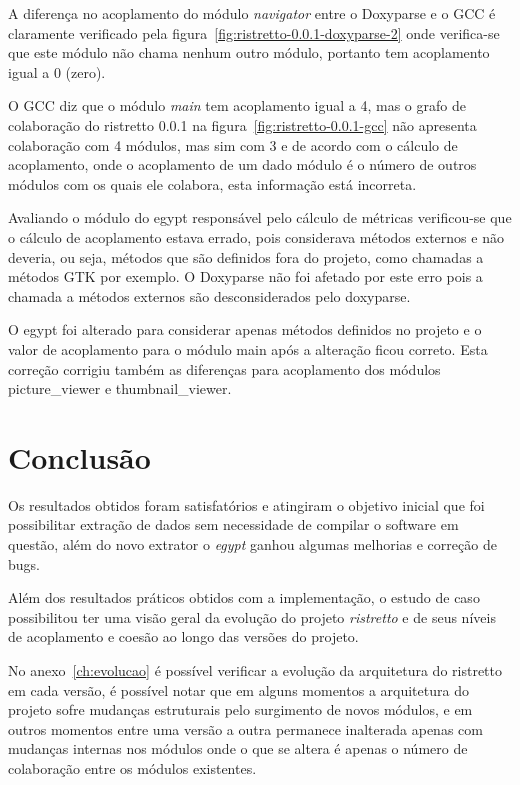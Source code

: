 A diferença no acoplamento do módulo {\it navigator} entre o Doxyparse e o GCC
é claramente verificado pela figura~\ref{fig:ristretto-0.0.1-doxyparse-2} onde
verifica-se que este módulo não chama nenhum outro módulo, portanto tem
acoplamento igual a 0 (zero).

O GCC diz que o módulo {\it main} tem acoplamento igual a 4, mas o grafo de
colaboração do ristretto 0.0.1 na figura~\ref{fig:ristretto-0.0.1-gcc} não
apresenta colaboração com 4 módulos, mas sim com 3 e de acordo com o cálculo de
acoplamento, onde o acoplamento de um dado módulo é o número de outros módulos
com os quais ele colabora, esta informação está incorreta.

Avaliando o módulo do egypt responsável pelo cálculo de métricas verificou-se
que o cálculo de acoplamento estava errado, pois considerava métodos externos e
não deveria, ou seja, métodos que são definidos fora do projeto, como chamadas
a métodos GTK por exemplo. O Doxyparse não foi
afetado por este erro pois a chamada a métodos externos são desconsiderados
pelo doxyparse.

O egypt foi alterado para considerar apenas métodos definidos no projeto e o
valor de acoplamento para o módulo main após a alteração ficou correto. Esta
correção corrigiu também as diferenças para acoplamento dos módulos
picture\_viewer e thumbnail\_viewer.


\chapter{Conclusão} \label{ch:conclusao}

Os resultados obtidos foram satisfatórios e atingiram o objetivo inicial que
foi possibilitar extração de dados sem necessidade de compilar o software em
questão, além do novo extrator o {\it egypt} ganhou algumas melhorias e
correção de bugs.

Além dos resultados práticos obtidos com a implementação, o estudo de caso
possibilitou ter uma visão geral da evolução do projeto {\it ristretto} e de
seus níveis de acoplamento e coesão ao longo das versões do projeto.

No anexo~\ref{ch:evolucao} é possível verificar a evolução da arquitetura do
ristretto em cada versão, é possível notar que em alguns momentos a arquitetura
do projeto sofre mudanças estruturais pelo surgimento de novos módulos, e em
outros momentos entre uma versão a outra permanece inalterada apenas com
mudanças internas nos módulos onde o que se altera é apenas o número de
colaboração entre os módulos existentes.

